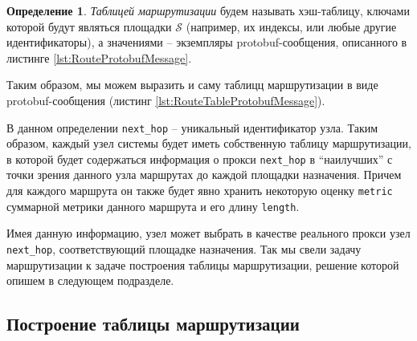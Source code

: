 \documentclass{article}
\theoremstyle{plain}
\theoremstyle{plain}
\theoremstyle{plain}
\theoremstyle{plain}
\theoremstyle{definition}
\newtheorem{definition}{Определение}[section]
\theoremstyle{remark}
\theoremstyle{plain}
\begin{document}
\begin{definition}
    \textit{Таблицей маршрутизации} будем называть хэш-таблицу, ключами которой будут являться площадки $\mathcal{S}$ (например, их индексы, или любые другие идентификаторы), а значениями -- экземпляры protobuf-сообщения, описанного в листинге \ref{lst:RouteProtobufMessage}.
\end{definition}
    
    
Таким образом, мы можем выразить и саму таблицц маршрутизации в виде protobuf-сообщения (листинг \ref{lst:RouteTableProtobufMessage}).
    

В данном определении \texttt{next\_hop} -- уникальный идентификатор узла. Таким образом, каждый узел системы будет иметь собственную таблицу маршрутизации, в которой будет содержаться информация о прокси \texttt{next\_hop} в \enquote{наилучших} с точки зрения данного узла маршрутах до каждой площадки назначения. Причем для каждого маршрута он также будет явно хранить некоторую оценку \texttt{metric} суммарной метрики данного маршрута и его длину \texttt{length}.

Имея данную информацию, узел может выбрать в качестве реального прокси узел \texttt{next\_hop}, соответствующий площадке назначения. Так мы свели задачу маршрутизации к задаче построения таблицы маршрутизации, решение которой опишем в следующем подразделе.

\subsection{Построение таблицы маршрутизации}
\end{document}
